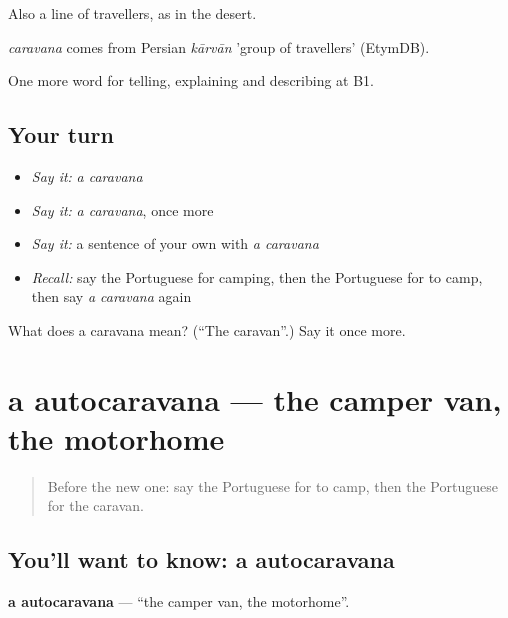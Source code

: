 Also a line of travellers, as in the desert.

\begin{cousinweb}
\emph{caravana} comes from Persian \emph{kārvān} 'group of travellers' (EtymDB).
\end{cousinweb}

\begin{grammarlens}[title={What you've built}]
One more word for telling, explaining and describing at B1.
\end{grammarlens}

\subsection*{Your turn}
\begin{itemize}
\raggedright
  \item \emph{Say it:} \emph{a caravana}
  \item \emph{Say it:} \emph{a caravana}, once more
  \item \emph{Say it:} a sentence of your own with \emph{a caravana}
  \item \emph{Recall:} say the Portuguese for camping, then the Portuguese for to camp, then say \emph{a caravana} again
\end{itemize}

\begin{tcolorbox}[breakable,colback=teal!4,colframe=teal!35!black,title={Before you move on}]
What does a caravana mean? (\textquotedblleft{}The caravan\textquotedblright{}.) Say it once more.
\end{tcolorbox}
\section[a autocaravana]{a autocaravana — the camper van, the motorhome}

\label{lesson:PT-C426-autocaravana}



\begin{quote}
Before the new one: say the Portuguese for to camp, then the Portuguese for the caravan.
\end{quote}

\subsection*{You'll want to know: a autocaravana}
\textbf{a autocaravana} — \textquotedblleft{}the camper van, the motorhome\textquotedblright{}.

